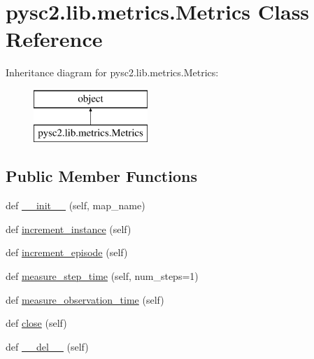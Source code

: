 \hypertarget{classpysc2_1_1lib_1_1metrics_1_1_metrics}{}\section{pysc2.\+lib.\+metrics.\+Metrics Class Reference}
\label{classpysc2_1_1lib_1_1metrics_1_1_metrics}
Inheritance diagram for pysc2.\+lib.\+metrics.\+Metrics\+:\begin{figure}[H]
\begin{center}
\leavevmode
\includegraphics[height=2.000000cm]{classpysc2_1_1lib_1_1metrics_1_1_metrics}
\end{center}
\end{figure}
\subsection*{Public Member Functions}
\begin{DoxyCompactItemize}
\item 
def \mbox{\hyperlink{classpysc2_1_1lib_1_1metrics_1_1_metrics_ab37401f172201cc69edf4c574bf3528f}{\+\_\+\+\_\+init\+\_\+\+\_\+}} (self, map\+\_\+name)
\item 
def \mbox{\hyperlink{classpysc2_1_1lib_1_1metrics_1_1_metrics_ab47568f6fd6658a8e90a8f22fe226996}{increment\+\_\+instance}} (self)
\item 
def \mbox{\hyperlink{classpysc2_1_1lib_1_1metrics_1_1_metrics_a9be503f4e7cdac4e3d0b919cdff95a35}{increment\+\_\+episode}} (self)
\item 
def \mbox{\hyperlink{classpysc2_1_1lib_1_1metrics_1_1_metrics_a3b13b00f7ab9a0d97e61011db7b40794}{measure\+\_\+step\+\_\+time}} (self, num\+\_\+steps=1)
\item 
def \mbox{\hyperlink{classpysc2_1_1lib_1_1metrics_1_1_metrics_ac2559f001b888031e4c7ab49b651479a}{measure\+\_\+observation\+\_\+time}} (self)
\item 
def \mbox{\hyperlink{classpysc2_1_1lib_1_1metrics_1_1_metrics_a2c2e9d83ab40f8d6df984ee21f30ecbf}{close}} (self)
\item 
def \mbox{\hyperlink{classpysc2_1_1lib_1_1metrics_1_1_metrics_a4ae4ba202f9f230f27c4c9dfb224f77e}{\+\_\+\+\_\+del\+\_\+\+\_\+}} (self)
\end{DoxyCompactItemize}


